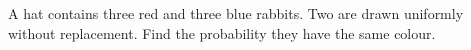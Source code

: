 A hat contains three red and three blue rabbits. Two are drawn uniformly without replacement. Find the probability they have the same colour.
